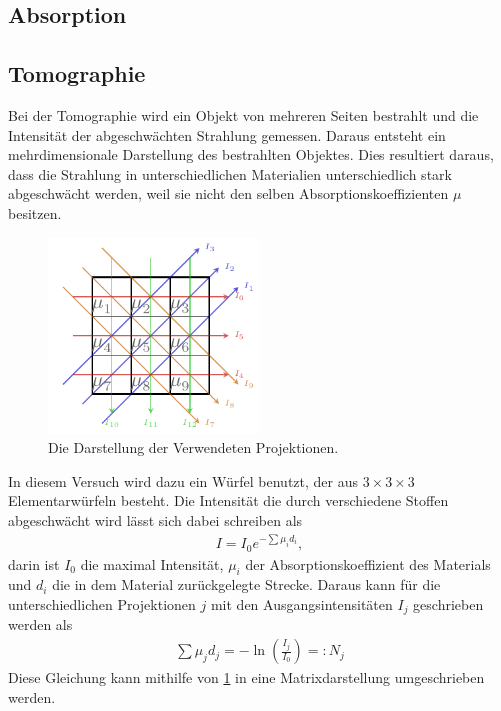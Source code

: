 \subsection{Absorption}

\subsection{Tomographie}
Bei der Tomographie wird ein Objekt von mehreren Seiten bestrahlt und die Intensität der abgeschwächten Strahlung gemessen.
Daraus entsteht ein mehrdimensionale Darstellung des bestrahlten Objektes.
Dies resultiert daraus, dass die Strahlung in unterschiedlichen Materialien unterschiedlich stark abgeschwächt werden, weil sie nicht den selben Absorptionskoeffizienten $\mu$ besitzen.\\
\begin{figure}
	\centering
	\includegraphics[width=0.5\textwidth]{../Grafiken/Tikz/tikz-Projektionen.pdf}
	\caption{Die Darstellung der Verwendeten Projektionen.\label{fig:Projektion}}
\end{figure}
In diesem Versuch wird dazu ein Würfel benutzt, der aus $3\times3\times3$ Elementarwürfeln besteht.
Die Intensität die durch verschiedene Stoffen abgeschwächt wird lässt sich dabei schreiben als
\begin{align}
	I = I_0e^{-\sum \mu_i d_i},
\end{align}
darin ist $I_0$ die maximal Intensität, $\mu_i$ der Absorptionskoeffizient des Materials und $d_i$ die in dem Material zurückgelegte Strecke. 
Daraus kann für die unterschiedlichen Projektionen $j$ mit den Ausgangsintensitäten $I_j$ geschrieben werden als
\begin{align}
	\sum \mu_j d_j = -\ln\left(\frac{I_j}{I_0}\right)=:N_j
\end{align}
\newpage
Diese Gleichung kann mithilfe von \cref{fig:Projektion} in eine Matrixdarstellung umgeschrieben werden.

